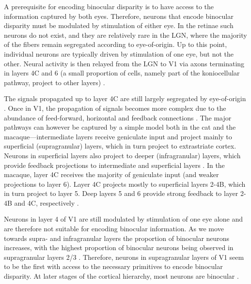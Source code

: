 A prerequisite for encoding binocular disparity is to have access to the information captured by both eyes. Therefore, neurons that encode binocular disparity must be modulated by stimulation of either eye. In the retinae such neurons do not exist, and they are relatively rare in the LGN, where the majority of the fibers remain segregated according to eye-of-origin. Up to this point, individual neurons are typically driven by stimulation of one eye, but not the other. Neural activity is then relayed from the LGN to V1 via axons terminating in layers 4C and 6 (a small proportion of cells, namely part of the koniocellular pathway, project to other layers) \cite{Nassi:2009hd}.

The signals propagated up to layer 4C are still largely segregated by eye-of-origin \cite{Hubel:1968hz}. Once in V1, the propagation of signals becomes more complex due to the abundance of feed-forward, horizontal and feedback connections \cite{Callaway1998, Nassi:2009hd, Harris:2013vn}. The major pathways can however be captured by a simple model both in the cat and the macaque---intermediate layers receive geniculate input and project mainly to superficial (supragranular) layers, which in turn project to extrastriate cortex. Neurons in superficial layers also project to deeper (infragranular) layers, which provide feedback projections to intermediate and superficial layers \cite{Callaway1998}. In the macaque, layer 4C receives the majority of geniculate input (and weaker projections to layer 6). Layer 4C projects mostly to superficial layers 2-4B, which in turn project to layer 5. Deep layers 5 and 6 provide strong feedback to layer 2-4B and 4C, respectively \cite{Callaway1998}.

Neurons in layer 4 of V1 are still modulated by stimulation of one eye alone \cite{Hubel:1968hz} and are therefore not suitable for encoding binocular information. As we move towards supra- and infragranular layers the proportion of binocular neurons increases, with the highest proportion of binocular neurons being observed in supragranular layers 2/3 \cite{Hubel:1968hz, Poggio1972}. Therefore, neurons in supragranular layers of V1 seem to be the first with access to the necessary primitives to encode binocular disparity. At later stages of the cortical hierarchy, most neurons are binocular \cite{Burkhalter:1986fk, Maunsell:1987vn}.



